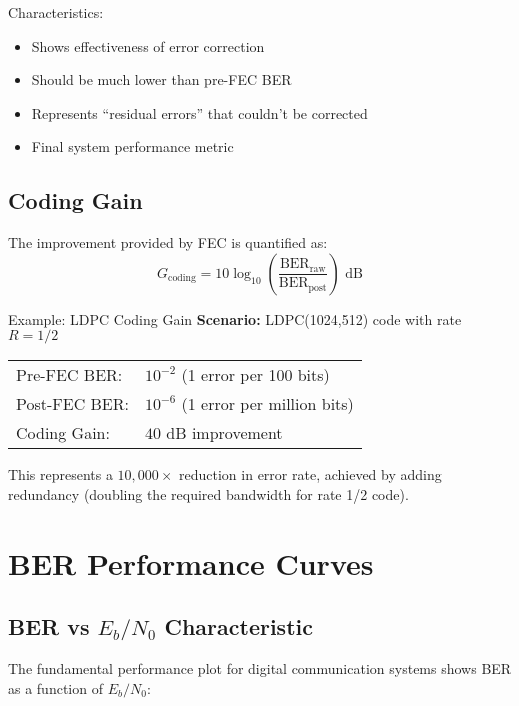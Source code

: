 Characteristics:
\begin{itemize}
\item Shows effectiveness of error correction
\item Should be much lower than pre-FEC BER
\item Represents ``residual errors'' that couldn't be corrected
\item Final system performance metric
\end{itemize}

\subsection{Coding Gain}

The improvement provided by FEC is quantified as:
\begin{equation}
G_{\mathrm{coding}} = 10\log_{10}\left(\frac{\mathrm{BER}_{\mathrm{raw}}}{\mathrm{BER}_{\mathrm{post}}}\right) \text{ dB}
\label{eq:coding-gain}
\end{equation}

\begin{calloutbox}{Example: LDPC Coding Gain}
\textbf{Scenario:} LDPC(1024,512) code with rate $R = 1/2$

\begin{tabular}{@{}ll@{}}
Pre-FEC BER: & $10^{-2}$ (1 error per 100 bits) \\
Post-FEC BER: & $10^{-6}$ (1 error per million bits) \\
Coding Gain: & $40$ dB improvement \\
\end{tabular}

This represents a $10,000\times$ reduction in error rate, achieved by adding redundancy (doubling the required bandwidth for rate 1/2 code).
\end{calloutbox}

\section{BER Performance Curves}

\subsection{BER vs $E_b/N_0$ Characteristic}

The fundamental performance plot for digital communication systems shows BER as a function of $E_b/N_0$:

